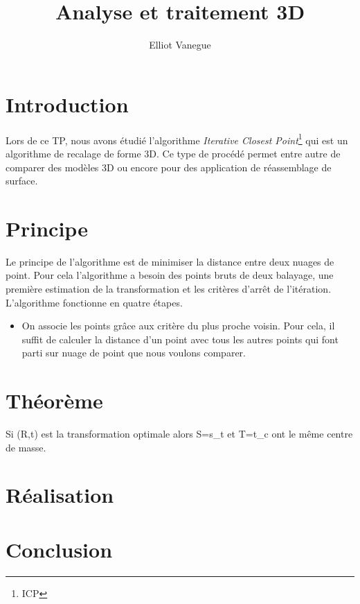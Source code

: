 \documentclass[a4paper,10pt]{article}
\title{Analyse et traitement 3D}
\author{Elliot Vanegue}
\begin{document}
\maketitle

\section{Introduction}
Lors de ce TP, nous avons étudié l'algorithme \textit{Iterative Closest Point}\footnote{ICP} qui est un algorithme de
recalage de forme 3D. Ce type de procédé permet entre autre de comparer des modèles 3D ou encore pour des application 
de réassemblage de surface.

\section{Principe}
Le principe de l'algorithme est de minimiser la distance entre deux nuages de point. Pour cela l'algorithme a besoin
des points bruts de deux balayage, une première estimation de la transformation et les critères d'arrêt de l'itération.
L'algorithme fonctionne en quatre étapes.
\begin{itemize}
 \item On associe les points grâce aux critère du plus proche voisin. Pour cela, il suffit de calculer la distance
 d'un point avec tous les autres points qui font parti sur nuage de point que nous voulons comparer.
\end{itemize}


\section{Théorème}
Si (R,t) est la transformation optimale alors S={s_t} et T={t_c} ont le même centre de masse.
\section{Réalisation}

\section{Conclusion}
\end{document}
